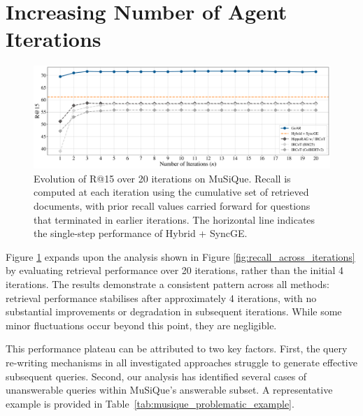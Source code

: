 \section{Increasing Number of Agent Iterations}
\label{appendix_sec:increasing_n_iterations}
\begin{figure}[thbp]
\centering
\includegraphics[width=\textwidth]{figures/experiments/recall_evolution_across_agent_iterations_20_iters.pdf}
\caption{Evolution of R@15 over 20 iterations on MuSiQue. Recall is computed at each iteration using the cumulative set of retrieved documents, with prior recall values carried forward for questions that terminated in earlier iterations. The horizontal line indicates the single-step performance of Hybrid + SyncGE.}
\label{fig:recall_across_iterations_20_iters}
\end{figure}

Figure \ref{fig:recall_across_iterations_20_iters} expands upon the analysis shown in Figure \ref{fig:recall_across_iterations} by evaluating retrieval performance over 20 iterations, rather than the initial 4 iterations. The results demonstrate a consistent pattern across all methods: retrieval performance stabilises after approximately 4 iterations, with no substantial improvements or degradation in subsequent iterations. While some minor fluctuations occur beyond this point, they are negligible.

This performance plateau can be attributed to two key factors. First, the query re-writing mechanisms in all investigated approaches struggle to generate effective subsequent queries. Second, our analysis has identified several cases of unanswerable queries within MuSiQue's answerable subset. A representative example is provided in Table~\ref{tab:musique_problematic_example}.


